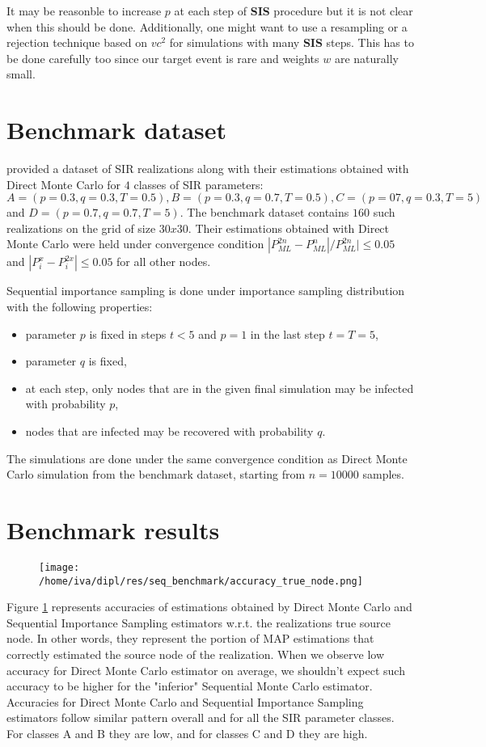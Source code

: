 \documentclass[times, utf8, diplomski]{fer}
\begin{document}
It may be reasonble to increase $p$ at each step of \textbf{SIS} procedure but it is not clear when this should be done. Additionally, one might want to use a resampling or a rejection technique based on $vc^2$ for simulations with many  \textbf{SIS} steps. This has to be done carefully too since our target event is rare and weights $w$ are naturally small.


\section{Benchmark dataset}
\cite{Nino} provided a dataset of SIR realizations along with their estimations obtained with Direct Monte Carlo for $4$ classes of SIR parameters: $A = (p = 0.3, q = 0.3, T =0 .5), B = (p = 0.3, q = 0.7, T = 0.5), C = (p = 07, q = 0.3, T = 5)$ and  $D = (p = 0.7, q = 0.7, T = 5)$. The benchmark dataset contains $160$ such realizations on the grid of size $30x30$.
 Their estimations obtained with Direct Monte Carlo were held under convergence condition $|P_{ML}^{2n} - P_{ML}^{n}| / P_{ML}^{2n}| \leq 0.05$  and $|P_i^x - P_i^{2x}| \leq 0.05$ for all other nodes.
 
Sequential importance sampling is done under importance sampling distribution with the following properties:
\begin{itemize}
\item{parameter $p$ is fixed in steps $t<5$ and $p=1$ in the last step $t= T = 5$,}
\item{parameter $q$ is fixed,}
\item{at each step, only nodes that are in the given final simulation may be infected with probability $p$,}
\item{nodes that are infected may be recovered with probability $q$.}
\end{itemize}

The simulations are done under the same convergence condition as Direct Monte Carlo simulation from the benchmark dataset, starting from $n = 10000$ samples.

\section{Benchmark results}
\begin{figure}[H]
\texttt{[image: /home/iva/dipl/res/seq\_benchmark/accuracy\_true\_node.png]}
\caption{}
\label{accuracy_true}
\end{figure}
Figure \ref{accuracy_true} represents accuracies of estimations obtained by Direct Monte Carlo and Sequential Importance Sampling estimators w.r.t. the realizations true source node. In other words, they represent the portion of MAP estimations that correctly estimated the source node of the realization. When we observe low accuracy for Direct Monte Carlo estimator on average, we shouldn't expect such accuracy to be higher for the "inferior" Sequential Monte Carlo estimator. Accuracies for Direct Monte Carlo and Sequential Importance Sampling estimators follow similar pattern overall and for all the SIR parameter classes. For classes A and B they are low, and for classes C and D they are high. 
\end{document}
